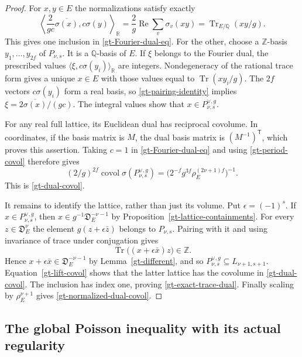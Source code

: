 \begin{proof}
For $x,y\in E$ the normalizations satisfy exactly
\begin{equation}\label{gt-pairing-identity}
 \left\langle\frac2{gc}\overline{\sigma(x)},
                         c\sigma(y)\right\rangle_{\mathbb R}
       =\frac2g\operatorname{Re}\sum_v\sigma_v(xy)
       =\operatorname{Tr}_{E/\mathbb Q}(xy/g).
\end{equation}
This gives one inclusion in \eqref{gt-Fourier-dual-eq}.
For the other, choose a $\mathbb Z$-basis $y_1,\ldots,y_{2f}$
of $P_{\nu,s}$.  It is a $\mathbb Q$-basis of $E$.
If $\xi$ belongs to the Fourier dual, the prescribed values
$\langle\xi,c\sigma(y_i)\rangle_{\mathbb R}$ are integers.
Nondegeneracy of the rational trace form gives a unique $x\in E$
with those values equal to $\operatorname{Tr}(xy_i/g)$.
The $2f$ vectors $c\sigma(y_i)$ form a real basis, so
\eqref{gt-pairing-identity} implies
$\xi=2\overline{\sigma(x)}/(gc)$.
The integral values show that $x\in P_{\nu,s}^{\vee,g}$.

For any real full lattice, its Euclidean dual has reciprocal
covolume.  In coordinates, if the basis matrix is $M$, the dual
basis matrix is $(M^{-1})^{\mathsf T}$, which proves this assertion.
Taking $c=1$ in \eqref{gt-Fourier-dual-eq} and using
\eqref{gt-period-covol} therefore gives
\[
 (2/g)^{2f}\operatorname{covol}\sigma(P_{\nu,s}^{\vee,g})
       =\bigl(2^{-f}g^{3f}\rho_E^{(2\nu+1)f}\bigr)^{-1}.
\]
This is \eqref{gt-dual-covol}.

It remains to identify the lattice, rather than just its volume.
Put $\epsilon=(-1)^s$.  If $x\in P_{\nu,s}^{\vee,g}$, then
$x\in g^{-1}\mathfrak D_E^{-\nu-1}$ by
Proposition~\ref{gt-lattice-containments}.
For every $z\in\mathfrak D_E^\nu$ the element
$g(z+\epsilon\bar z)$ belongs to $P_{\nu,s}$.
Pairing with it and using invariance of trace under conjugation
gives
\[
 \operatorname{Tr}\bigl((x+\epsilon\bar x)z\bigr)\in\mathbb Z.
\]
Hence $x+\epsilon\bar x\in\mathfrak D_E^{-\nu-1}$ by
Lemma~\ref{gt-different}, and so
$P_{\nu,s}^{\vee,g}\subseteq L_{\nu+1,s+1}$.
Equation~\eqref{gt-lift-covol} shows that the latter lattice has
the covolume in \eqref{gt-dual-covol}.  The inclusion has index
one, proving \eqref{gt-exact-trace-dual}.  Finally scaling by
$\rho_E^{\nu+1}$ gives \eqref{gt-normalized-dual-covol}.
\end{proof}

\subsection{The global Poisson inequality with its actual regularity}

